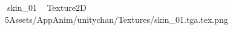    skin_01             	   Texture2D
   5   Assets/AppAnim/unitychan/Textures/skin_01.tga.tex.png